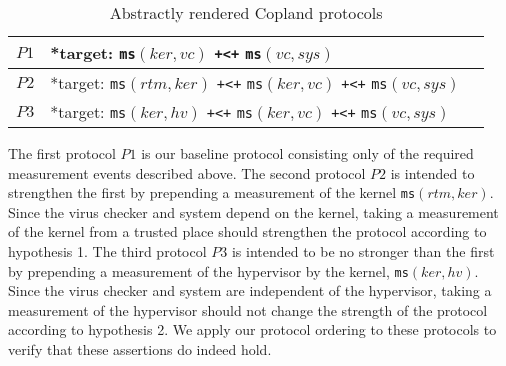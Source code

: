 \documentclass[runningheads]{llncs}
\theoremstyle{definition}
\begin{document}

\begin{table}[h]
  \setlength\extrarowheight{7pt}
  \centering
  \footnotesize
  \begin{tabular}{|M{1cm}|M{8cm}|N}
      \hline  
      $P1$ & *target:  \texttt{ms}$(ker, vc)$ \texttt{+<+} \texttt{ms}$(vc, sys)$ &\\ \hline 
      $P2$ & *target: \texttt{ms}$(rtm, ker)$ \texttt{+<+} \texttt{ms}$(ker, vc)$ \texttt{+<+} \texttt{ms}$(vc, sys)$ &\\
      \hline
      $P3$ & *target: \texttt{ms}$(ker, hv)$ \texttt{+<+} \texttt{ms}$(ker, vc)$ \texttt{+<+} \texttt{ms}$(vc, sys)$ &\\ \hline 
  \end{tabular}
  \caption[Chase Analysis with Varied Dependencies]{Abstractly rendered Copland protocols}
  \label{Chase-table}
\end{table}

The first protocol $P1$ is our baseline protocol consisting only of
the required measurement events described above. The second protocol
$P2$ is intended to strengthen the first by prepending a measurement
of the kernel \texttt{ms}$(rtm,ker)$. Since the virus checker and
system depend on the kernel, taking a measurement of the kernel from a
trusted place should strengthen the protocol according to hypothesis
1. The third protocol $P3$ is intended to be no stronger than the
first by prepending a measurement of the hypervisor by the kernel,
\texttt{ms}$(ker,hv)$. Since the virus checker and system are
independent of the hypervisor, taking a measurement of the hypervisor
should not change the strength of the protocol according to hypothesis
2. We apply our protocol ordering to these protocols to verify that
these assertions do indeed hold.
\end{document}
